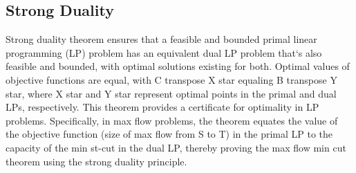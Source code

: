 \subsection*{Strong Duality}
Strong duality theorem ensures that a feasible and bounded primal linear programming (LP) problem has an equivalent dual LP problem that`s also feasible and bounded, with optimal solutions existing for both.
Optimal values of objective functions are equal, with C transpose X star equaling B transpose Y star, where X star and Y star represent optimal points in the primal and dual LPs, respectively.
This theorem provides a certificate for optimality in LP problems.
Specifically, in max flow problems, the theorem equates the value of the objective function (size of max flow from S to T) in the primal LP to the capacity of the min st-cut in the dual LP, thereby proving the max flow min cut theorem using the strong duality principle.

